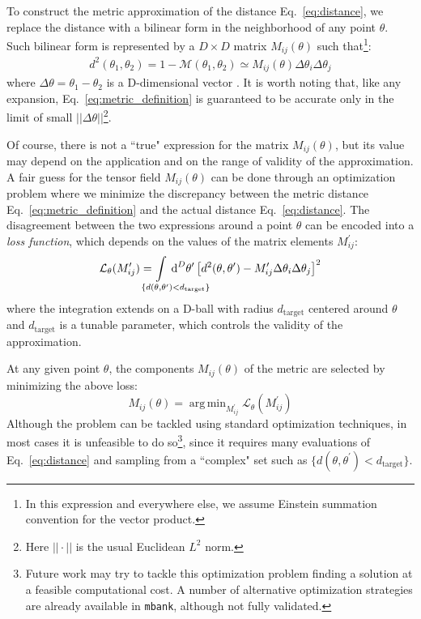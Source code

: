 \documentclass[twocolumn,showpacs,preprintnumbers,nofootinbib,prd,
superscriptaddress,10pt]{revtex4-2}
\newcommand{\dvol}[2]{\ensuremath{\operatorname{d}^{#2}\!{#1}}}
\DeclareMathOperator*{\argmin}{arg\,min}
\begin{document}
To construct the metric approximation of the distance Eq.~\eqref{eq:distance}, we replace the distance with a bilinear form in the neighborhood of any point $\theta$. Such bilinear form is represented by a $D\times D$ matrix $M_{ij}(\theta)$ such that\footnote{
In this expression and everywhere else, we assume Einstein summation convention for the vector product.}:
\begin{align}\label{eq:metric_definition}
	d^2(\theta_1,\theta_2) = 1 - \mathcal{M}(\theta_1,\theta_2) \simeq M_{ij}(\theta) \Delta\theta_i \Delta\theta_j
\end{align}
where $\Delta\theta = \theta_1-\theta_2$ is a D-dimensional vector \cite{owen_metric}.
It is worth noting that, like any expansion, Eq.~\eqref{eq:metric_definition} is guaranteed to be accurate only in the limit of small $||\Delta\theta||$\footnote{Here $||\cdot||$ is the usual Euclidean $L^2$ norm.}.

Of course, there is not a ``true" expression for the matrix $M_{ij}(\theta)$, but its value may depend on the application and on the range of validity of the approximation.
A fair guess for the tensor field $M_{ij}(\theta)$ can be done through an optimization problem where we minimize the discrepancy between the metric distance Eq.~\eqref{eq:metric_definition} and the actual distance Eq.~\eqref{eq:distance}.
The disagreement between the two expressions around a point $\theta$ can be encoded into a {\it loss function}, which depends on the values of the matrix elements $M^\prime_{ij}$:
\begin{equation} \label{eq:loss_function}
	\mathcal{L}_\theta(M^\prime_{ij}) = \hspace{-4em} \int\limits_{\hspace{3em}\{d(\theta,\theta^\prime) < d_\mathrm{target}\}} \hspace{-3.8em}
		\dvol{\theta^\prime}{D}  \left[ d^2(\theta,\theta^\prime) - M^\prime_{ij} \Delta\theta_i \Delta\theta_j \right]^2
\end{equation}
where the integration extends on a D-ball with radius $d_\mathrm{target}$ centered around $\theta$ and $d_\mathrm{target}$ is a tunable parameter, which controls the validity of the approximation.

At any given point $\theta$, the components $M_{ij}(\theta)$ of the metric are selected by minimizing the above loss:
\begin{equation} \label{eq:metric_optmization}
	M_{ij}(\theta) = \argmin_{M^\prime_{ij}}  \mathcal{L}_\theta(M^\prime_{ij})
\end{equation}
Although the problem can be tackled using standard optimization techniques, in most cases it is unfeasible to do so\footnote{
Future work may try to tackle this optimization problem finding a solution at a feasible computational cost. A number of alternative optimization strategies are already available in \texttt{mbank}, although not fully validated.},
since it requires many evaluations of Eq.~\eqref{eq:distance} and sampling from a ``complex" set such as $\{d(\theta,\theta^\prime) < d_\mathrm{target}\}$.
\end{document}
